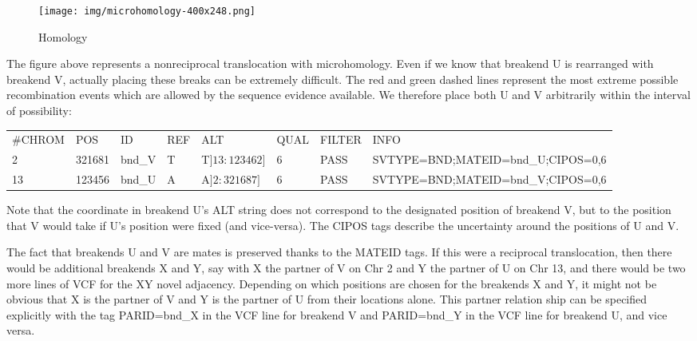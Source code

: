 \documentclass[8pt]{article}
\begin{document}
\begin{figure}[h]
\centering
\texttt{[image: img/microhomology-400x248.png]}
\caption{Homology}
\end{figure}

The figure above represents a nonreciprocal translocation with microhomology. Even if we know that breakend U is rearranged with breakend V, actually placing these breaks can be extremely difficult. The red and green dashed lines represent the most extreme possible recombination events which are allowed by the sequence evidence available. We therefore place both U and V arbitrarily within the interval of possibility:

\vspace{0.3cm}
\footnotesize
\begin{tabular}{ l l l l l l l l }
\#CHROM & POS & ID & REF & ALT & QUAL & FILTER & INFO \\
2 & 321681 & bnd\_V & T & T$]13:123462]$ & 6 & PASS & SVTYPE=BND;MATEID=bnd\_U;CIPOS=0,6 \\
13 & 123456 & bnd\_U & A & A$]2:321687]$ & 6 & PASS & SVTYPE=BND;MATEID=bnd\_V;CIPOS=0,6 \\
\end{tabular}
\normalsize
\vspace{0.3cm}

Note that the coordinate in breakend U's ALT string does not correspond to the designated position of breakend V, but to the position that V would take if U's position were fixed (and vice-versa). The CIPOS tags describe the uncertainty around the positions of U and V.

The fact that breakends U and V are mates is preserved thanks to the MATEID tags. If this were a reciprocal translocation, then there would be additional breakends X and Y, say with X the partner of V on Chr 2 and Y the partner of U on Chr 13, and there would be two more lines of VCF for the XY novel adjacency. Depending on which positions are chosen for the breakends X and Y, it might not be obvious that X is the partner of V and Y is the partner of U from their locations alone. This partner relation ship can be specified explicitly with the tag PARID=bnd\_X in the VCF line for breakend V and PARID=bnd\_Y in the VCF line for breakend U, and vice versa.
\end{document}
